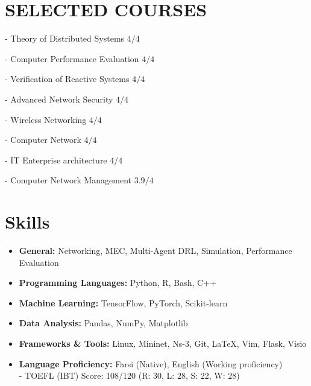 \documentclass[11pt]{article}
\begin{document}
\section{SELECTED COURSES}
		\vspace{-5mm}
	     \setlength\itemsep{0em}
	     \begin{multicols}{2}
				- Theory of Distributed Systems  \hfill $4/4$ 
				
			    -  Computer Performance Evaluation \hfill $4/4$
			    
			    - Verification of Reactive Systems  \hfill  $4/4$
			     
				 - Advanced Network Security  \hfill $4/4$
				 
		         - Wireless Networking  \hfill $4/4$
		         
		         - Computer Network  \hfill $4/4$
		         
		          - IT Enterprise architecture  \hfill  $4/4$
		         
		         - Computer Network Management  \hfill $3.9/4$
		         

		         
		     \end{multicols}


\section{Skills}



\begin{itemize}[noitemsep,topsep=0pt,parsep=0pt,partopsep=0pt]
	\item {\textbf{General:} Networking, MEC, Multi-Agent DRL, Simulation, Performance Evaluation}\vspace{1mm}
	\item {\textbf{Programming Languages:} Python, R, Bash, C++}\vspace{1mm}
	\item {\textbf{Machine Learning:} TensorFlow, PyTorch, Scikit-learn}\vspace{1mm}
	\item {\textbf{Data Analysis:} Pandas, NumPy, Matplotlib}\vspace{1mm}
	\item {\textbf{Frameworks \& Tools:} Linux, Mininet, Ns-3, Git, \LaTeX, Vim, Flask, Visio}\vspace{1mm}
	\item {\textbf{Language Proficiency:} Farsi (Native), English (Working proficiency)}\vspace{1mm}\\
	- TOEFL (IBT) Score: 108/120 (R: 30, L: 28, S: 22, W: 28)


\end{itemize}
\end{document}
